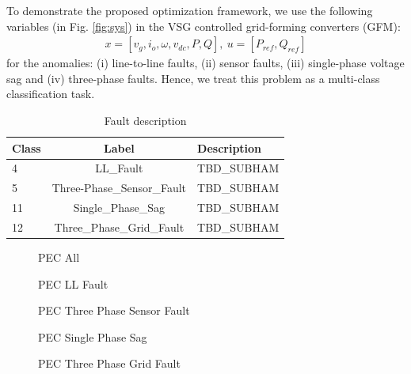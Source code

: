 To demonstrate the  proposed optimization framework, we use the following variables (in Fig. \ref{fig:sys}) in the VSG controlled grid-forming converters (GFM):
\begin{eqnarray}
x = [v_g, i_o, \omega, v_{dc}, P, Q], \ u=[P_{ref}, Q_{ref}]
\end{eqnarray}
for the anomalies: (i) line-to-line faults, (ii) sensor faults, (iii) single-phase voltage sag and (iv) three-phase faults. Hence, we treat this problem as a multi-class classification task. 
\begin{table}[H]
\centering

\begin{tabular}{|l|c|l|}
    \hline
	\textbf{Class} & \textbf{Label} & \textbf{Description} \\ \hline
	4 & LL\_Fault & TBD\_SUBHAM \\ \hline
	5 & Three-Phase\_Sensor\_Fault & TBD\_SUBHAM \\ \hline
	11 & Single\_Phase\_Sag & TBD\_SUBHAM \\ \hline
	12 & Three\_Phase\_Grid\_Fault & TBD\_SUBHAM \\ \hline
\end{tabular}%
\caption{Fault description}
\label{fault_desc}
\end{table}

\begin{figure}[H]
    \centering
    
    \caption{PEC All}
    \label{fig:pec_all}
\end{figure}

\begin{figure}[H]
    \centering
    
    \caption{PEC LL Fault}
    \label{fig:pec_ll_fault}
\end{figure}

\begin{figure}[H]
    \centering
    
    \caption{PEC Three Phase Sensor Fault}
    \label{fig:pec_three_phase_sensor}
\end{figure}

\begin{figure}[H]
    \centering
    
    \caption{PEC Single Phase Sag}
    \label{fig:pec_single_phase_sag}
\end{figure}

\begin{figure}[H]
    \centering
    
    \caption{PEC Three Phase Grid Fault}
    \label{fig:pec_three_phase_grid_fault}
\end{figure}


